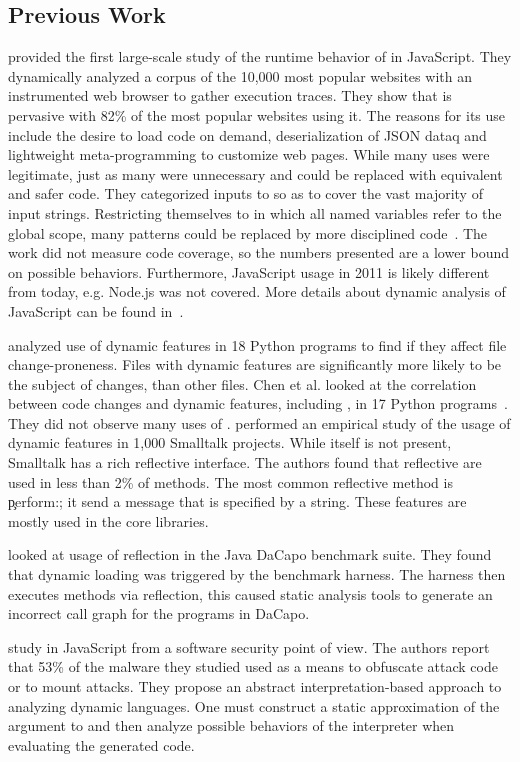 \documentclass[screen,acmsmall]{acmart}
\begin{document}
\subsection{Previous Work}

\citet{ecoop11} provided the first large-scale study of the runtime behavior of
\eval in JavaScript. They dynamically analyzed a corpus of the 10,000 most
popular websites with an instrumented web browser to gather execution traces.
They show that \eval is pervasive with 82\% of the most popular websites using
it. The reasons for its use include the desire to load code on demand,
deserialization of JSON dataq and lightweight meta-programming to customize web
pages. While many uses were legitimate, just as many were unnecessary and could
be replaced with equivalent and safer code. They categorized inputs to \eval so
as to cover the vast majority of input strings. Restricting themselves to \eval
in which all named variables refer to the global scope, many patterns could be
replaced by more disciplined code~\cite{oopsla12b, moller12}. The work did not
measure code coverage, so the numbers presented are a lower bound on possible
behaviors. Furthermore, JavaScript usage in 2011 is likely different from today,
e.g. Node.js was not covered. More details about dynamic analysis of JavaScript
can be found in~\cite{liang}.

\citet{wang} analyzed use of dynamic features in 18 Python programs to find if
they affect file change-proneness. Files with dynamic features are significantly
more likely to be the subject of changes, than other files. Chen et al. looked
at the correlation between code changes and dynamic features, including \eval,
in 17 Python programs~\cite{chen}. They did not observe many uses of \eval.
\citet{oscar} performed an empirical study of the usage of dynamic features in
1,000 Smalltalk projects. While \eval itself is not present, Smalltalk has a
rich reflective interface. The authors found that reflective are used in less
than 2\% of methods. The most common reflective method is \c{perform:}; it send
a message that is specified by a string. These features are mostly used in the
core libraries.

\citet{bodden} looked at usage of reflection in the Java DaCapo benchmark suite.
They found that dynamic loading was triggered by the benchmark harness. The
harness then executes methods via reflection, this caused static analysis tools
to generate an incorrect call graph for the programs in DaCapo.

\citet{Arceri21} study \eval in JavaScript from a software security point of
view. The authors report that 53\% of the malware they studied used \eval as a
means to obfuscate attack code or to mount attacks. They propose an abstract
interpretation-based approach to analyzing dynamic languages. One must construct
a static approximation of the argument to \eval and then analyze possible
behaviors of the interpreter when evaluating the generated code.
\end{document}
